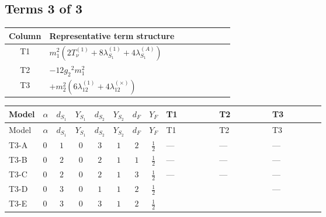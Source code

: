 \documentclass[8pt]{article}
\begin{document}
\begin{landscape}
\subsection*{Terms 3 of 3}
\begin{center}
\begin{tabular}{@{}c >{\raggedright\arraybackslash}p{0.82\linewidth}@{}}
\toprule
Column & Representative term structure \\
\midrule
T1 & \(\displaystyle {m_1^2} (2 T_{\nu}^{(1)}+8 {\lambda_{S_1}^{(1)}}+4 {\lambda_{S_1}^{(A)}})\) \\
\midrule
T2 & \(\displaystyle -12 {g_2}^2 {m_1^2}\) \\
\midrule
T3 & \(\displaystyle +{m_2^2} (6 {\lambda_{12}^{(1)}}+4 {\lambda_{12}^{(\times)}})\) \\
\midrule
\bottomrule
\end{tabular}
\end{center}
\smallskip
\tiny
\begin{longtable}{@{}llcccccc >{\raggedright\arraybackslash}p{0.21\linewidth} >{\raggedright\arraybackslash}p{0.21\linewidth} >{\raggedright\arraybackslash}p{0.21\linewidth}@{}}
\toprule
Model & $\alpha$ & $d_{S_1}$ & $Y_{S_1}$ & $d_{S_2}$ & $Y_{S_2}$ & $d_F$ & $Y_F$ & T1 & T2 & T3 \\
\midrule
\endfirsthead
\toprule
Model & $\alpha$ & $d_{S_1}$ & $Y_{S_1}$ & $d_{S_2}$ & $Y_{S_2}$ & $d_F$ & $Y_F$ & T1 & T2 & T3 \\
\midrule
\endhead
T3-A & $0$ & $1$ & $0$ & $3$ & $1$ & $2$ & $\frac{1}{2}$ & --- & --- & --- \\
\midrule
T3-B & $0$ & $2$ & $0$ & $2$ & $1$ & $1$ & $\frac{1}{2}$ & --- & --- & --- \\
\midrule
T3-C & $0$ & $2$ & $0$ & $2$ & $1$ & $3$ & $\frac{1}{2}$ & --- & --- & --- \\
\midrule
T3-D & $0$ & $3$ & $0$ & $1$ & $1$ & $2$ & $\frac{1}{2}$ & \scriptsize\adjustbox{max width=\linewidth}{$\begin{gathered} {m_1^2} (2 T_{\nu}^{(1)}+8 {\lambda_{S_1}^{(1)}}+4 {\lambda_{S_1}^{(A)}})\end{gathered}$} & \scriptsize\adjustbox{max width=\linewidth}{$\begin{gathered} -12 {g_2}^2 {m_1^2}\end{gathered}$} & --- \\
\midrule
T3-E & $0$ & $3$ & $0$ & $3$ & $1$ & $2$ & $\frac{1}{2}$ & \scriptsize\adjustbox{max width=\linewidth}{$\begin{gathered} {m_1^2} (2 T_{\nu}^{(1)}+8 {\lambda_{S_1}^{(1)}}+4 {\lambda_{S_1}^{(A)}})\end{gathered}$} & \scriptsize\adjustbox{max width=\linewidth}{$\begin{gathered} -12 {g_2}^2 {m_1^2}\end{gathered}$} & \scriptsize\adjustbox{max width=\linewidth}{$\begin{gathered} +{m_2^2} (6 {\lambda_{12}^{(1)}}+4 {\lambda_{12}^{(\times)}})\end{gathered}$} \\
\midrule
\bottomrule
\end{longtable}
\clearpage

\end{landscape}
\end{document}
